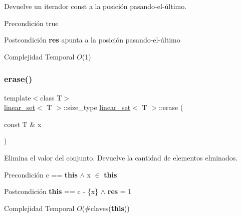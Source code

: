 Devuelve un iterador const a la posición pasando-\/el-\/último. 

\begin{DoxyPrecond}{Precondición}
true 
\end{DoxyPrecond}
\begin{DoxyPostcond}{Postcondición}
{\bfseries res} apunta a la posición pasando-\/el-\/último
\end{DoxyPostcond}

\begin{DoxyDescription}
\item[Complejidad Temporal]$O$(1)
\end{DoxyDescription}\mbox{\label{classlinear__set_a264d97735943af5490e73e469c3e7303}} 
\subsubsection{\texorpdfstring{erase()}{erase()}}
{\footnotesize\ttfamily template$<$class T$>$ \\
\mbox{\hyperlink{classlinear__set}{linear\+\_\+set}}$<$ T $>$\+::size\+\_\+type \mbox{\hyperlink{classlinear__set}{linear\+\_\+set}}$<$ T $>$\+::erase (\begin{DoxyParamCaption}\item[{const T \&}]{x }\end{DoxyParamCaption})}



Elimina el valor del conjunto. Devuelve la cantidad de elementos elminados. 

\begin{DoxyPrecond}{Precondición}
c == {\bfseries this} $\land$ x $\in$ {\bfseries this} 
\end{DoxyPrecond}
\begin{DoxyPostcond}{Postcondición}
{\bfseries this} == c -\/ \{x\} $\land$ {\bfseries res} = 1
\end{DoxyPostcond}

\begin{DoxyDescription}
\item[Complejidad Temporal]$O$(\#claves({\bfseries this}))
\end{DoxyDescription}\mbox{\label{classlinear__set_a095fc4a1f15f43650efa7518aa58579f}} 
